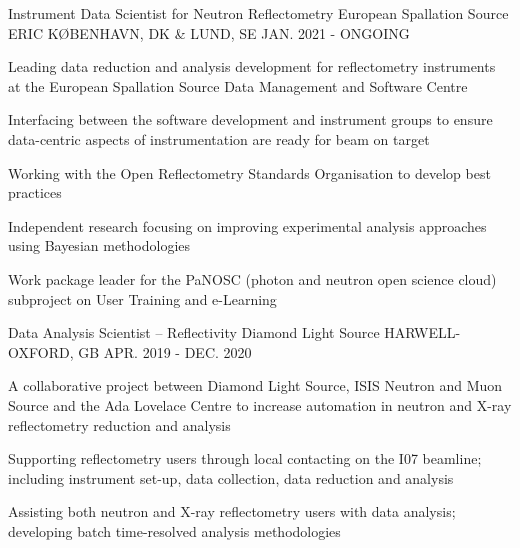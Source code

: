 \begin{cventries}
  \cventry
    {Instrument Data Scientist for Neutron Reflectometry}
    {European Spallation Source ERIC}
    {K\O BENHAVN, DK \& LUND, SE}
    {JAN. 2021 - ONGOING}
    {
      \begin{cvitems}
        \item {Leading data reduction and analysis development for reflectometry instruments at the European Spallation Source Data Management and Software Centre}
        \item {Interfacing between the software development and instrument groups to ensure data-centric aspects of instrumentation are ready for beam on target}
        \item {Working with the Open Reflectometry Standards Organisation to develop best practices}
        \item {Independent research focusing on improving experimental analysis approaches using Bayesian methodologies}
        \item {Work package leader for the PaNOSC (photon and neutron open science cloud) subproject on User Training and e-Learning}
      \end{cvitems}
    }
  \cventry
    {Data Analysis Scientist -- Reflectivity}
    {Diamond Light Source}
    {HARWELL-OXFORD, GB}
    {APR. 2019 - DEC. 2020}
    {
      \begin{cvitems}
        \item {A collaborative project between Diamond Light Source, ISIS Neutron and Muon Source and the Ada Lovelace Centre to increase automation in neutron and X-ray reflectometry reduction and analysis}
        \item {Supporting reflectometry users through local contacting on the I07 beamline; including instrument set-up, data collection, data reduction and analysis}
        \item {Assisting both neutron and X-ray reflectometry users with data analysis; developing batch time-resolved analysis methodologies}
      \end{cvitems}
    }
\end{cventries}
